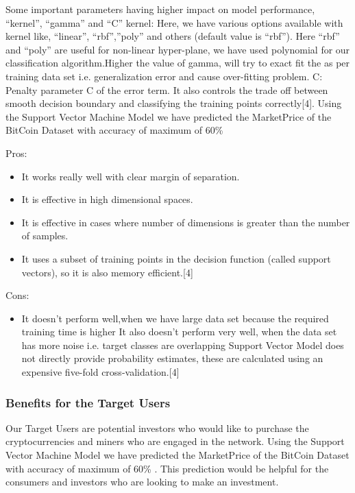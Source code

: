 \documentclass{article}
\begin{document}
Some important parameters having higher impact on model performance, “kernel”, “gamma” and “C”
kernel: Here, we have various options available with kernel like, “linear”, “rbf”,”poly” and others (default value is “rbf”).  Here “rbf” and “poly” are useful for non-linear hyper-plane, we have used polynomial for our classification algorithm.Higher the value of gamma, will try to exact fit the as per training data set i.e. generalization error and cause over-fitting problem. C: Penalty parameter C of the error term. It also controls the trade off between smooth decision boundary and classifying the training points correctly[4]. Using the Support Vector Machine Model we have predicted the Market\textunderscore Price of the BitCoin Dataset with accuracy of maximum of 60\%  \newline

Pros:
\begin{itemize}
\item It works really well with clear margin of separation.
\item It is effective in high dimensional spaces.
\item It is effective in cases where number of dimensions is greater than the number of samples.
\item It uses a subset of training points in the decision function (called support vectors), so it is also memory efficient.[4]
\end{itemize} 
\newpage
Cons:
\begin{itemize}
\item It doesn’t perform well,when we have large data set because the required training time is higher
It also doesn’t perform very well, when the data set has more noise i.e. target classes are overlapping
Support Vector Model does not directly provide probability estimates, these are calculated using an expensive five-fold cross-validation.[4] 
\end{itemize}
\subsubsection {Benefits for the Target Users}

Our Target Users are potential investors who would like to purchase the cryptocurrencies and miners who are engaged in the network. Using the Support Vector Machine Model we have predicted the Market\textunderscore Price of the BitCoin Dataset with accuracy of maximum of 60\% . This prediction would be helpful for the consumers and investors who are looking to make an investment.
\end{document}
